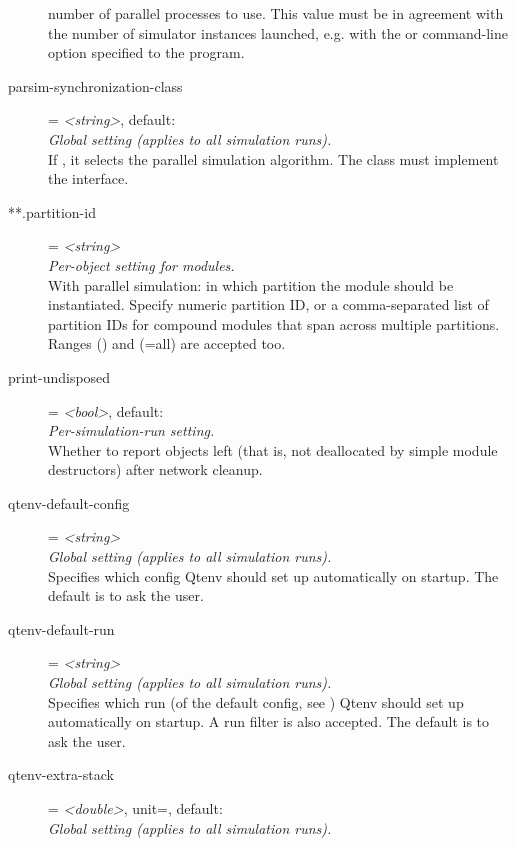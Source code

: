 \begin{description}
    number of parallel processes to use. This value must be in agreement with
    the number of simulator instances launched, e.g. with the
     or  command-line option
    specified to the  program.
\item[parsim-synchronization-class] = \textit{<string>}, default: \\
    \textit{Global setting (applies to all simulation runs).}\\
    If , it selects the
    parallel simulation algorithm. The class must implement the
     interface.
\item[**.partition-id] = \textit{<string>}\\
    \textit{Per-object setting for modules.}\\
    With parallel simulation: in which partition the module should be
    instantiated. Specify numeric partition ID, or a comma-separated list of
    partition IDs for compound modules that span across multiple partitions.
    Ranges () and \ttt{*} (=all) are accepted too.
\item[print-undisposed] = \textit{<bool>}, default: \\
    \textit{Per-simulation-run setting.}\\
    Whether to report objects left (that is, not deallocated by simple module
    destructors) after network cleanup.
\item[qtenv-default-config] = \textit{<string>}\\
    \textit{Global setting (applies to all simulation runs).}\\
    Specifies which config Qtenv should set up automatically on startup. The
    default is to ask the user.
\item[qtenv-default-run] = \textit{<string>}\\
    \textit{Global setting (applies to all simulation runs).}\\
    Specifies which run (of the default config, see
    ) Qtenv should set up
    automatically on startup. A run filter is also accepted. The default is to
    ask the user.
\item[qtenv-extra-stack] = \textit{<double>}, unit=, default: \\
    \textit{Global setting (applies to all simulation runs).}\\

\end{description}
